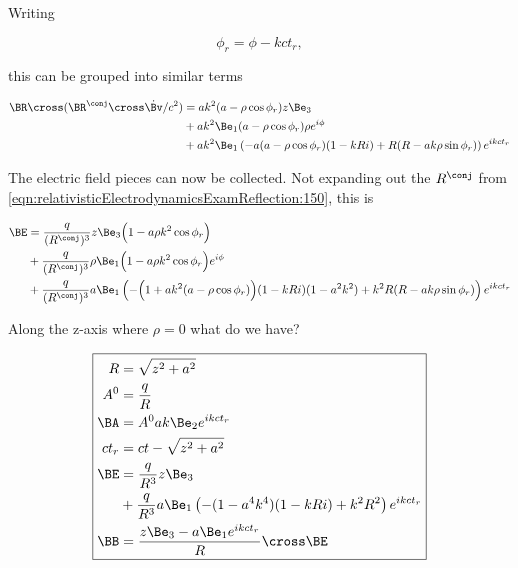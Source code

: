 Writing

\begin{equation}\label{eqn:relativisticElectrodynamicsExamReflection:640}
\phi_r = \phi - k c t_r,
\end{equation}

this can be grouped into similar terms

\begin{equation}\label{eqn:relativisticElectrodynamicsExamReflection:660}
\begin{aligned}
\BR \cross (\BR^\conj \cross \dot{\Bv}/c^2)
&=
a k^2 
(a - \rho \cos\phi_r) z \Be_3 \\
&+ 
a k^2 
\Be_1
(a - \rho \cos\phi_r) \rho e^{i\phi} \\
&+ 
a k^2 
\Be_1
\left(
-a (a - \rho \cos\phi_r) (1 - k R i)
+ R(R - a k \rho \sin \phi_r)
\right) e^{i k c t_r}
\end{aligned}
\end{equation}

The electric field pieces can now be collected.  Not expanding out the $R^\conj$ from \ref{eqn:relativisticElectrodynamicsExamReflection:150}, this is

\begin{equation}\label{eqn:gramSchmidtLorentz:n}
\begin{aligned}
\BE &= 
\frac{q}{(R^\conj)^3} z \Be_3
\Bigl( 1 - a \rho k^2 \cos\phi_r \Bigr) \\
&+
\frac{q}{(R^\conj)^3} \rho
\Be_1 \Bigl(1 - a \rho k^2 \cos\phi_r \Bigr) e^{i\phi} \\
&+
\frac{q}{(R^\conj)^3} a \Be_1
\left(
-\Bigl( 1 + a k^2 (a - \rho \cos\phi_r) \Bigr) (1 - k R i)(1 - a^2 k^2)
+ k^2 R(R - a k \rho \sin \phi_r)
\right) e^{i k c t_r}
\end{aligned}
\end{equation}

Along the z-axis where $\rho = 0$ what do we have?

\begin{equation}\label{eqn:relativisticElectrodynamicsExamReflection:500}
\boxed{
\begin{aligned}
R &= \sqrt{z^2 + a^2 } \\
A^0 &= \frac{q}{R} \\
\BA &= A^0 a k \Be_2 e^{i k c t_r } \\
c t_r &= c t - \sqrt{z^2 + a^2 } \\
\BE &= 
\frac{q}{R^3} z \Be_3 \\
&+
\frac{q}{R^3} a \Be_1
\left(
-( 1 - a^4 k^4 ) (1 - k R i)
+ k^2 R^2 
\right) e^{i k c t_r} \\
\BB &= \frac{ z \Be_3 - a \Be_1 e^{i k c t_r}}{R} \cross \BE
\end{aligned}
}
\end{equation}

